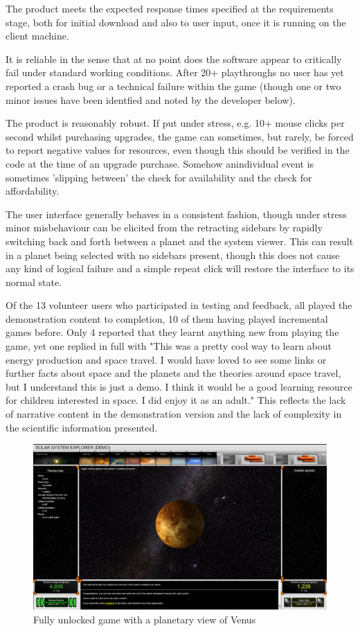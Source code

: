 \documentclass[twoside]{bhamthesis}
\begin{document}
The product meets the expected response times specified at the requirements stage, both for initial download and also to user input, once it is running on the client machine.

It is reliable in the sense that at no point does the software appear to critically fail under standard working conditions. After 20+ playthroughs no user has yet reported a crash bug or a technical failure within the game (though one or two  minor issues have been identfied and noted by the developer below).

The product is reasonably robust. If put under stress, e.g. 10+ mouse clicks per second whilst purchasing upgrades, the game can sometimes, but rarely, be forced to report negative values for resources, even though this should be verified in the code at the time of an upgrade purchase. Somehow anindividual event is sometimes 'slipping between' the check for availability and the check for affordability.

The user interface generally behaves in a consistent fashion, though under stress minor misbehaviour can be elicited from the retracting sidebars by rapidly switching back and forth between a planet and the system viewer. This can result in a planet being selected with no sidebars present, though this does not cause any kind of logical failure and a simple repeat click will restore the interface to its normal state.

Of the 13 volunteer users who participated in testing and feedback, all played the demonstration content to completion, 10 of them having played incremental games before. Only 4 reported that they learnt anything new from playing the game, yet one replied in full with "This was a pretty cool way to learn about energy production and space travel. I would have loved to see some links or further facts about space and the planets and the theories around space travel, but I understand this is just a demo. I think it would be a good learning resource for children interested in space. I did enjoy it as an adult." This reflects the lack of narrative content in the demonstration version and the lack of complexity in the scientific information presented.

\begin{figure}[h!]
  \includegraphics[width=\linewidth]{images/venus.png}
  \caption{Fully unlocked game with a planetary view of Venus}
  \label{fig:venus}
\end{figure}
\end{document}
